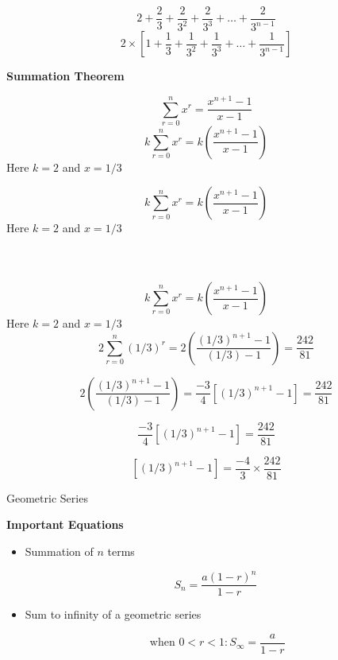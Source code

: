 \documentclass[12pt]{article}
\begin{document}
\[  2 + \frac{2}{3} + \frac{2}{3^2} + \frac{2}{3^3} +  \ldots + \frac{2}{3^{n-1}} \]
\[  2 \times \left[ 1 + \frac{1}{3} + \frac{1}{3^2} + \frac{1}{3^3} +  \ldots + \frac{1}{3^{n-1}}   \right] \]

\textbf{Summation Theorem}

\[ \sum^{n}_{r=0} x^r = \frac{x^{n+1}-1}{x-1} \]
\[ k  \sum^{n}_{r=0} x^r  =  k \left( \frac{x^{n+1}-1}{x-1} \right) \]
Here $k=2$ and $x = 1/3$ 






\[ k  \sum^{n}_{r=0} x^r  =  k \left( \frac{x^{n+1}-1}{x-1} \right) \]
Here $k=2$ and $x = 1/3$ 
\[  \phantom{ 2  \sum^{n}_{r=0} (1/3)^r  =  2 \left( \frac{(1/3)^{n+1}-1}{(1/3)-1} \right) } \]






\[ k  \sum^{n}_{r=0} x^r  =  k \left( \frac{x^{n+1}-1}{x-1} \right) \]
Here $k=2$ and $x = 1/3$ 
\[  2  \sum^{n}_{r=0} (1/3)^r  =  2 \left( \frac{(1/3)^{n+1}-1}{(1/3)-1} \right)  = \frac{242}{81} \]





\[    2 \left( \frac{(1/3)^{n+1}-1}{(1/3)-1} \right)  = \frac{-3}{4} \left[ (1/3)^{n+1}-1 \right]  = \frac{242}{81} \]

\[     \frac{-3}{4} \left[ (1/3)^{n+1}-1 \right]  = \frac{242}{81} \]

\[      \left[ (1/3)^{n+1}-1 \right]  =  \frac{-4}{3} \times \frac{242}{81} \]





{Geometric Series}

\textbf{Important Equations}
\begin{itemize}
\item Summation of $n$ terms
{

\[ S_n = \frac{a(1-r)^n}{1-r} \]
}
\item Sum to infinity of a geometric series
{

\[ \mbox{ when } 0 < r < 1 : S_{\infty} = \frac{a}{1-r} \]
}
\end{itemize}
\end{document}
